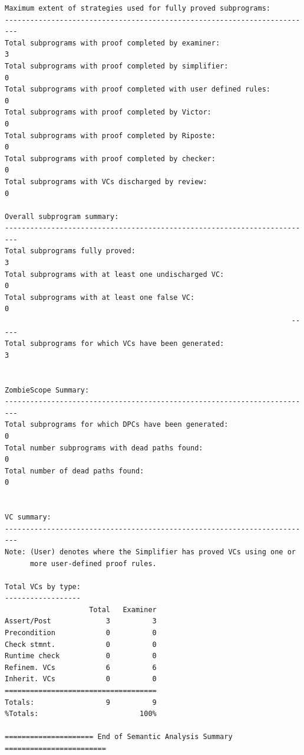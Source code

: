 \documentclass[a4paper, titlepage]{article}
\begin{document}
{\begin{lstlisting}
Maximum extent of strategies used for fully proved subprograms:
-------------------------------------------------------------------------
Total subprograms with proof completed by examiner:                     3
Total subprograms with proof completed by simplifier:                   0
Total subprograms with proof completed with user defined rules:         0
Total subprograms with proof completed by Victor:                       0
Total subprograms with proof completed by Riposte:                      0
Total subprograms with proof completed by checker:                      0
Total subprograms with VCs discharged by review:                        0

Overall subprogram summary:
-------------------------------------------------------------------------
Total subprograms fully proved:                                         3
Total subprograms with at least one undischarged VC:                    0
Total subprograms with at least one false VC:                           0
                                                                    -----
Total subprograms for which VCs have been generated:                    3


ZombieScope Summary:
-------------------------------------------------------------------------
Total subprograms for which DPCs have been generated:                   0
Total number subprograms with dead paths found:                         0
Total number of dead paths found:                                       0


VC summary:
-------------------------------------------------------------------------
Note: (User) denotes where the Simplifier has proved VCs using one or
      more user-defined proof rules.

Total VCs by type:
------------------
                    Total   Examiner
Assert/Post             3          3
Precondition            0          0
Check stmnt.            0          0
Runtime check           0          0
Refinem. VCs            6          6
Inherit. VCs            0          0
====================================
Totals:                 9          9
%Totals:                        100%

===================== End of Semantic Analysis Summary ========================

\end{lstlisting}
}
\end{document}
